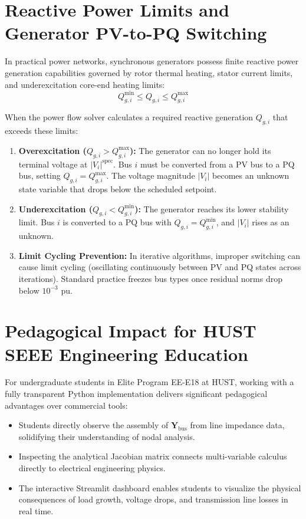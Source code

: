 \documentclass[12pt,a4paper,oneside]{report}
\begin{document}
\section{Reactive Power Limits and Generator PV-to-PQ Switching}
In practical power networks, synchronous generators possess finite reactive power generation capabilities governed by rotor thermal heating, stator current limits, and underexcitation core-end heating limits:
\begin{equation}
Q_{g,i}^{\min} \le Q_{g,i} \le Q_{g,i}^{\max}
\end{equation}

When the power flow solver calculates a required reactive generation $Q_{g,i}$ that exceeds these limits:
\begin{enumerate}
    \item \textbf{Overexcitation ($Q_{g,i} > Q_{g,i}^{\max}$):} The generator can no longer hold its terminal voltage at $|V_i|^{\text{spec}}$. Bus $i$ must be converted from a PV bus to a PQ bus, setting $Q_{g,i} = Q_{g,i}^{\max}$. The voltage magnitude $|V_i|$ becomes an unknown state variable that drops below the scheduled setpoint.
    \item \textbf{Underexcitation ($Q_{g,i} < Q_{g,i}^{\min}$):} The generator reaches its lower stability limit. Bus $i$ is converted to a PQ bus with $Q_{g,i} = Q_{g,i}^{\min}$, and $|V_i|$ rises as an unknown.
    \item \textbf{Limit Cycling Prevention:} In iterative algorithms, improper switching can cause limit cycling (oscillating continuously between PV and PQ states across iterations). Standard practice freezes bus types once residual norms drop below $10^{-3}\text{ pu}$.
\end{enumerate}

\section{Pedagogical Impact for HUST SEEE Engineering Education}
For undergraduate students in Elite Program EE-E18 at HUST, working with a fully transparent Python implementation delivers significant pedagogical advantages over commercial tools:
\begin{itemize}
    \item Students directly observe the assembly of $\mathbf{Y}_{\text{bus}}$ from line impedance data, solidifying their understanding of nodal analysis.
    \item Inspecting the analytical Jacobian matrix connects multi-variable calculus directly to electrical engineering physics.
    \item The interactive Streamlit dashboard enables students to visualize the physical consequences of load growth, voltage drops, and transmission line losses in real time.
\end{itemize}
\end{document}
